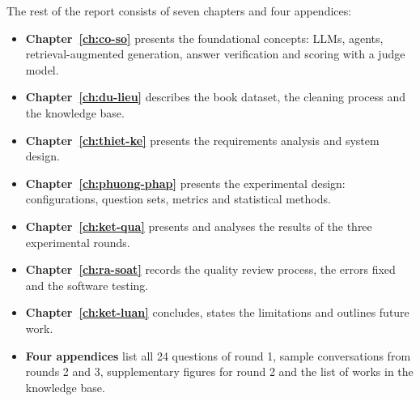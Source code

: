 The rest of the report consists of seven chapters and four appendices:

\begin{itemize}
    \item \textbf{Chapter~\ref{ch:co-so}} presents the foundational concepts: LLMs, agents, retrieval-augmented generation, answer verification and scoring with a judge model.
    \item \textbf{Chapter~\ref{ch:du-lieu}} describes the book dataset, the cleaning process and the knowledge base.
    \item \textbf{Chapter~\ref{ch:thiet-ke}} presents the requirements analysis and system design.
    \item \textbf{Chapter~\ref{ch:phuong-phap}} presents the experimental design: configurations, question sets, metrics and statistical methods.
    \item \textbf{Chapter~\ref{ch:ket-qua}} presents and analyses the results of the three experimental rounds.
    \item \textbf{Chapter~\ref{ch:ra-soat}} records the quality review process, the errors fixed and the software testing.
    \item \textbf{Chapter~\ref{ch:ket-luan}} concludes, states the limitations and outlines future work.
    \item \textbf{Four appendices} list all 24 questions of round 1, sample conversations from rounds 2 and 3, supplementary figures for round 2 and the list of works in the knowledge base.
\end{itemize}
